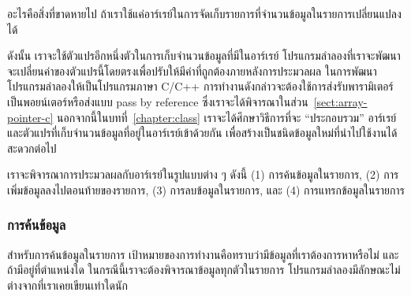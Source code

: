 \begin{quiz}{}
อะไร{\wbr}คือ{\wbr}สิ่ง{\wbr}ที่{\wbr}ขาด{\wbr}หาย{\wbr}ไป ถ้า{\wbr}เรา{\wbr}ใช้{\wbr}แค่{\wbr}อาร์เรย์{\wbr}ใน{\wbr}การ{\wbr}จัด{\wbr}เก็บ{\wbr}รายการ{\wbr}ที่{\wbr}จำนวน{\wbr}ข้อมูล{\wbr}ใน{\wbr}รายการ{\wbr}เปลี่ยนแปลง{\wbr}ได้{\wbr}
\end{quiz}

ดังนั้น เรา{\wbr}จะ{\wbr}ใช้{\wbr}ตัวแปร{\wbr}อีก{\wbr}หนึ่ง{\wbr}ตัว{\wbr}ใน{\wbr}การ{\wbr}เก็บ{\wbr}จำนวน{\wbr}ข้อมูล{\wbr}ที่{\wbr}มี{\wbr}ใน{\wbr}อาร์เรย์
โปรแกรม{\wbr}ลำ{\wbr}ลอง{\wbr}ที่{\wbr}เรา{\wbr}จะ{\wbr}พัฒนา{\wbr}จะ{\wbr}เปลี่ยน{\wbr}ค่า{\wbr}ของ{\wbr}ตัวแปร{\wbr}นี้{\wbr}โดย{\wbr}ตรง{\wbr}เพื่อ{\wbr}ปรับ{\wbr}ให้{\wbr}มี{\wbr}ค่า{\wbr}ที่{\wbr}ถูกต้อง{\wbr}ภายหลัง{\wbr}การ{\wbr}ประมวลผล{\wbr}
ใน{\wbr}การ{\wbr}พัฒนา{\wbr}โปรแกรม{\wbr}ลำ{\wbr}ลอง{\wbr}ให้{\wbr}เป็น{\wbr}โปรแกรม{\wbr}ภาษา C/C++
การ{\wbr}ทำงาน{\wbr}ดังกล่าว{\wbr}จะ{\wbr}ต้อง{\wbr}ใช้{\wbr}การ{\wbr}ส่ง{\wbr}รับ{\wbr}พารามิเตอร์{\wbr}เป็น{\wbr}พอยน์เตอร์{\wbr}หรือ{\wbr}ส่ง{\wbr}แบบ pass by
reference ซึ่ง{\wbr}เรา{\wbr}จะ{\wbr}ได้{\wbr}พิจารณา{\wbr}ใน{\wbr}ส่วน~\ref{sect:array-pointer-c}
นอกจากนี้{\wbr}ใน{\wbr}บท{\wbr}ที่~\ref{chapter:class} เรา{\wbr}จะ{\wbr}ได้{\wbr}ศึกษา{\wbr}วิธีการ{\wbr}ที่{\wbr}จะ ``ประกอบ{\wbr}รวม''
อาร์เรย์และ{\wbr}ตัวแปร{\wbr}ที่{\wbr}เก็บ{\wbr}จำนวน{\wbr}ข้อมูล{\wbr}ที่อยู่{\wbr}ใน{\wbr}อาร์เรย์{\wbr}เข้า{\wbr}ด้วย{\wbr}กัน{\wbr}
เพื่อ{\wbr}สร้าง{\wbr}เป็น{\wbr}ชนิด{\wbr}ข้อมูล{\wbr}ใหม่{\wbr}ที่{\wbr}นำ{\wbr}ไป{\wbr}ใช้{\wbr}งาน{\wbr}ได้{\wbr}สะดวก{\wbr}ต่อไป{\wbr}

เรา{\wbr}จะ{\wbr}พิจารณา{\wbr}การ{\wbr}ประมวลผล{\wbr}กับ{\wbr}อาร์เรย์{\wbr}ใน{\wbr}รูปแบบ{\wbr}ต่าง ๆ ดังนี้ (1) การ{\wbr}ค้น{\wbr}ข้อมูล{\wbr}ใน{\wbr}รายการ, (2) การ{\wbr}เพิ่ม{\wbr}ข้อมูล{\wbr}ลง{\wbr}ไป{\wbr}ตอน{\wbr}ท้าย{\wbr}ของ{\wbr}รายการ, (3) การ{\wbr}ลบ{\wbr}ข้อมูล{\wbr}ใน{\wbr}รายการ, และ (4) การ{\wbr}แทรก{\wbr}ข้อมูล{\wbr}ใน{\wbr}รายการ{\wbr}

\subsubsection{การ{\wbr}ค้น{\wbr}ข้อมูล} 
สำหรับ{\wbr}การ{\wbr}ค้น{\wbr}ข้อมูล{\wbr}ใน{\wbr}รายการ{\wbr}
เป้าหมาย{\wbr}ของ{\wbr}การ{\wbr}ทำงาน{\wbr}คือ{\wbr}ทราบ{\wbr}ว่า{\wbr}มี{\wbr}ข้อมูล{\wbr}ที่{\wbr}เรา{\wbr}ต้องการ{\wbr}หา{\wbr}หรือ{\wbr}ไม่ และ{\wbr}ถ้า{\wbr}มี{\wbr}อยู่{\wbr}ที่{\wbr}ตำแหน่ง{\wbr}ใด{\wbr}
ใน{\wbr}กรณี{\wbr}นี้{\wbr}เรา{\wbr}จะ{\wbr}ต้อง{\wbr}พิจารณา{\wbr}ข้อมูล{\wbr}ทุก{\wbr}ตัว{\wbr}ใน{\wbr}รายการ{\wbr}
โปรแกรม{\wbr}ลำ{\wbr}ลอง{\wbr}มี{\wbr}ลักษณะ{\wbr}ไม่{\wbr}ต่าง{\wbr}จาก{\wbr}ที่{\wbr}เรา{\wbr}เคย{\wbr}เขียน{\wbr}เท่าใด{\wbr}นัก{\wbr}

